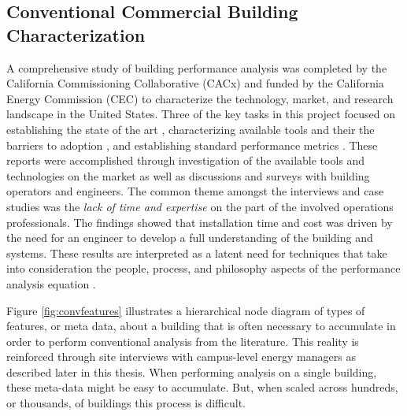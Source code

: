 \subsection{Conventional Commercial Building Characterization}
A comprehensive study of building performance analysis was completed by the California Commissioning Collaborative (CACx) and funded by the California Energy Commission (CEC) to characterize the technology, market, and research landscape in the United States. Three of the key tasks in this project focused on establishing the state of the art \cite{effinger_building_2010}, characterizing available tools and their the barriers to adoption \cite{ulickey_building_2010}, and establishing standard performance metrics \cite{greensfelder_building_2010}. These reports were accomplished through investigation of the available tools and technologies on the market as well as discussions and surveys with building operators and engineers. The common theme amongst the interviews and case studies was the \emph{lack of time and expertise} on the part of the involved operations professionals. The findings showed that installation time and cost was driven by the need for an engineer to develop a full understanding of the building and systems. These results are interpreted as a latent need for techniques that take into consideration the people, process, and philosophy aspects of the performance analysis equation \cite{miller_applicability_2013}. 

Figure \ref{fig:convfeatures} illustrates a hierarchical node diagram of types of features, or meta data, about a building that is often necessary to accumulate in order to perform conventional analysis from the literature. This reality is reinforced through site interviews with campus-level energy managers as described later in this thesis. When performing analysis on a single building, these meta-data might be easy to accumulate. But, when scaled across hundreds, or thousands, of buildings this process is difficult.

